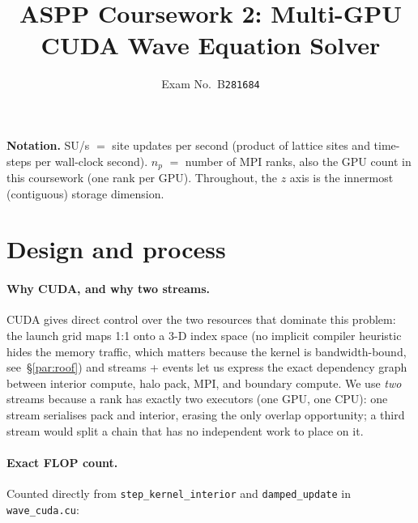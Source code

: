 \documentclass[10pt,a4paper]{article}
\title{\vspace{-3em}ASPP Coursework 2: Multi-GPU CUDA Wave Equation Solver}
\author{Exam No.\ B\texttt{281684}}
\date{\vspace{-0.3em}}
\begin{document}
\maketitle
\vspace{-1.0em}

\textbf{Notation.} SU/s $=$ site updates per second (product of lattice sites and time-steps per wall-clock second). $n_p$ $=$ number of MPI ranks, also the GPU count in this coursework (one rank per GPU). Throughout, the $z$ axis is the innermost (contiguous) storage dimension.

\section{Design and process}
\label{sec:design}

\paragraph{Why CUDA, and why two streams.}
CUDA gives direct control over the two resources that dominate this problem: the launch grid maps 1:1 onto a 3-D index space (no implicit compiler heuristic hides the memory traffic, which matters because the kernel is bandwidth-bound, see~\S\ref{par:roof}) and streams + events let us express the exact dependency graph between interior compute, halo pack, MPI, and boundary compute. We use \emph{two} streams because a rank has exactly two executors (one GPU, one CPU): one stream serialises pack and interior, erasing the only overlap opportunity; a third stream would split a chain that has no independent work to place on it.

\paragraph{Exact FLOP count.}
\label{par:flop}
Counted directly from \texttt{step\_kernel\_interior} and \texttt{damped\_update} in \texttt{wave\_cuda.cu}:
\end{document}
